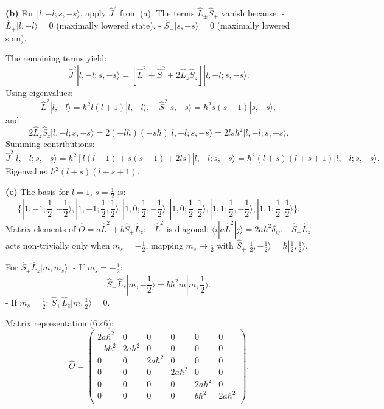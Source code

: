 \documentclass{article}
\begin{document}
\textbf{(b)} For \(|l, -l; s, -s\rangle\), apply \(\hat{J}^2\) from (a). The terms \(\hat{L}_\pm \hat{S}_\mp\) vanish because:
- \(\hat{L}_+ |l, -l\rangle = 0\) (maximally lowered state),
- \(\hat{S}_- |s, -s\rangle = 0\) (maximally lowered spin).

The remaining terms yield:
\[
\hat{J}^2 |l, -l; s, -s\rangle = \left[\hat{L}^2 + \hat{S}^2 + 2 \hat{L}_z \hat{S}_z\right] |l, -l; s, -s\rangle.
\]
Using eigenvalues:
\[
\hat{L}^2 |l, -l\rangle = \hbar^2 l(l+1) |l, -l\rangle, \quad \hat{S}^2 |s, -s\rangle = \hbar^2 s(s+1) |s, -s\rangle,
\]
and
\[
2 \hat{L}_z \hat{S}_z |l, -l; s, -s\rangle = 2(-l\hbar)(-s\hbar) |l, -l; s, -s\rangle = 2ls\hbar^2 |l, -l; s, -s\rangle.
\]
Summing contributions:
\[
\hat{J}^2 |l, -l; s, -s\rangle = \hbar^2 \left[l(l+1) + s(s+1) + 2ls\right] |l, -l; s, -s\rangle = \hbar^2 (l+s)(l+s+1) |l, -l; s, -s\rangle.
\]
Eigenvalue: \(\hbar^2 (l+s)(l+s+1)\).

\textbf{(c)} The basis for \(l=1\), \(s=\frac{1}{2}\) is:
\[
\{|1, -1; \frac{1}{2}, -\frac{1}{2}\rangle, |1, -1; \frac{1}{2}, \frac{1}{2}\rangle, |1, 0; \frac{1}{2}, -\frac{1}{2}\rangle, |1, 0; \frac{1}{2}, \frac{1}{2}\rangle, |1, 1; \frac{1}{2}, -\frac{1}{2}\rangle, |1, 1; \frac{1}{2}, \frac{1}{2}\rangle\}.
\]
Matrix elements of \(\hat{O} = a\hat{L}^2 + b\hat{S}_+\hat{L}_z\):
- \(\hat{L}^2\) is diagonal: \(\langle i | a\hat{L}^2 | j \rangle = 2a\hbar^2 \delta_{ij}\).
- \(\hat{S}_+\hat{L}_z\) acts non-trivially only when \(m_s = -\frac{1}{2}\), mapping \(m_s \to \frac{1}{2}\) with \(\hat{S}_+ |\frac{1}{2}, -\frac{1}{2}\rangle = \hbar |\frac{1}{2}, \frac{1}{2}\rangle\).

For \(\hat{S}_+\hat{L}_z |m, m_s\rangle\):
- If \(m_s = -\frac{1}{2}\):
  \[
  \hat{S}_+\hat{L}_z |m, -\frac{1}{2}\rangle = b\hbar^2 m |m, \frac{1}{2}\rangle.
  \]
- If \(m_s = \frac{1}{2}\): \(\hat{S}_+\hat{L}_z |m, \frac{1}{2}\rangle = 0\).

Matrix representation (6×6):
\[
\hat{O} = 
\begin{pmatrix}
2a\hbar^2 & 0 & 0 & 0 & 0 & 0 \\
-b\hbar^2 & 2a\hbar^2 & 0 & 0 & 0 & 0 \\
0 & 0 & 2a\hbar^2 & 0 & 0 & 0 \\
0 & 0 & 0 & 2a\hbar^2 & 0 & 0 \\
0 & 0 & 0 & 0 & 2a\hbar^2 & 0 \\
0 & 0 & 0 & 0 & b\hbar^2 & 2a\hbar^2 \\
\end{pmatrix}.
\]
\end{document}
